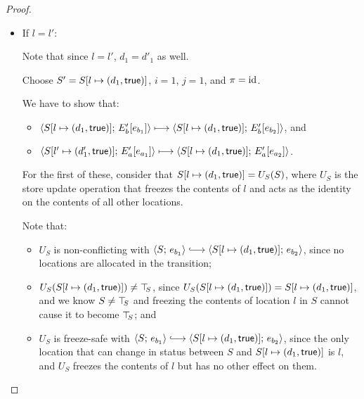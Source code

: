 \begin{proof}
\begin{enumerate}
\begin{enumerate}
\begin{itemize}
      \item If $l = l'$:


        Note that since $l = l'$, $d_1 = d'_1$ as well.

        Choose $S' = S[l \mapsto (d_1, \textsf{true})]$, $i = 1$, $j =
        1$, and $\pi = \mathrm{id}$.

        We have to show that:
        \begin{itemize}
        \item
          $\langle S[l \mapsto (d_1, \textsf{true})];\, E'_b\hspace{-0.5mm}\left[e_{b_1}\right] \rangle
          \longmapsto
          \langle S[l \mapsto (d_1, \textsf{true})];\, E'_b\hspace{-0.5mm}\left[e_{b_2}\right] \rangle$,
          and
        \item
          $\langle S[l' \mapsto (d'_1, \textsf{true})];\, E'_a\hspace{-0.5mm}\left[e_{a_1}\right] \rangle
          \longmapsto
          \langle S[l \mapsto (d_1, \textsf{true})];\, E'_a\hspace{-0.5mm}\left[e_{a_2}\right] \rangle$.
        \end{itemize}

        For the first of these, consider that
        $S[l \mapsto (d_1, \textsf{true})] = U_S(S)$, where $U_S$ is the
        store update operation that freezes the contents of $l$ and
        acts as the identity on the contents of all other locations.

        Note that:
        \begin{itemize}
        \item $U_S$ is non-conflicting with $\config{S}{e_{b_1}}
          \parstepsto
          \config{\extS{S}{l}{d_1}{\frozentrue}}{e_{b_2}}$, since no
          locations are allocated in the transition;
        \item $U_S(S[l \mapsto (d_1, \textsf{true})]) \neq \top\hspace{-0.85mm}_{S}$, since
          $U_S(S[l \mapsto (d_1, \textsf{true})]) =
          S[l \mapsto (d_1, \textsf{true})]$, and we know $S \neq \top\hspace{-0.85mm}_{S}$
          and freezing the contents of location $l$ in $S$ cannot
          cause it to become $\top\hspace{-0.85mm}_{S}$; and
        \item $U_S$ is freeze-safe with $\config{S}{e_{b_1}}
          \parstepsto
          \config{\extS{S}{l}{d_1}{\frozentrue}}{e_{b_2}}$, since
          the only location that can change in status between $S$
          and $S[l \mapsto (d_1, \textsf{true})]$ is $l$, and $U_S$
          freezes the contents of $l$ but has no other effect on
          them.
        \end{itemize}


\end{itemize}
\end{enumerate}
\end{enumerate}
\end{proof}
